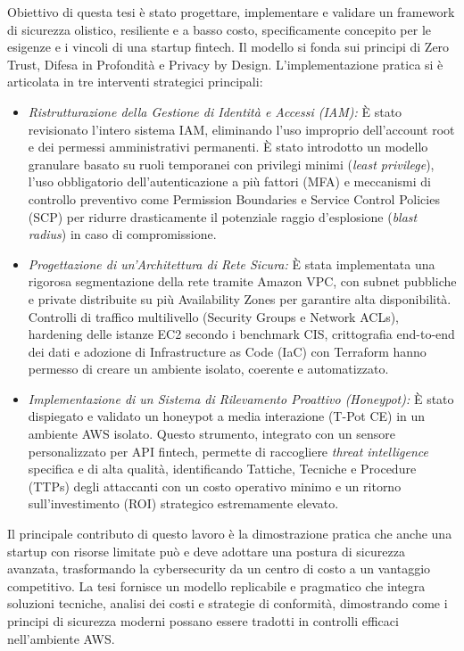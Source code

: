\documentclass[a4paper,12pt]{article}
\begin{document}
\noindent
Obiettivo di questa tesi è stato progettare, implementare e validare un framework di sicurezza olistico, resiliente e a basso costo, specificamente concepito per le esigenze e i vincoli di una startup fintech. Il modello si fonda sui principi di Zero Trust, Difesa in Profondità e Privacy by Design. L'implementazione pratica si è articolata in tre interventi strategici principali:
\begin{itemize}
    \item \textit{Ristrutturazione della Gestione di Identità e Accessi (IAM):} È stato revisionato l'intero sistema IAM, eliminando l'uso improprio dell'account root e dei permessi amministrativi permanenti. È stato introdotto un modello granulare basato su ruoli temporanei con privilegi minimi (\textit{least privilege}), l'uso obbligatorio dell'autenticazione a più fattori (MFA) e meccanismi di controllo preventivo come Permission Boundaries e Service Control Policies (SCP) per ridurre drasticamente il potenziale raggio d'esplosione (\textit{blast radius}) in caso di compromissione.
    \item \textit{Progettazione di un'Architettura di Rete Sicura:} È stata implementata una rigorosa segmentazione della rete tramite Amazon VPC, con subnet pubbliche e private distribuite su più Availability Zones per garantire alta disponibilità. Controlli di traffico multilivello (Security Groups e Network ACLs), hardening delle istanze EC2 secondo i benchmark CIS, crittografia end-to-end dei dati e adozione di Infrastructure as Code (IaC) con Terraform hanno permesso di creare un ambiente isolato, coerente e automatizzato.
    \item \textit{Implementazione di un Sistema di Rilevamento Proattivo (Honeypot):} È stato dispiegato e validato un honeypot a media interazione (T-Pot CE) in un ambiente AWS isolato. Questo strumento, integrato con un sensore personalizzato per API fintech, permette di raccogliere \textit{threat intelligence} specifica e di alta qualità, identificando Tattiche, Tecniche e Procedure (TTPs) degli attaccanti con un costo operativo minimo e un ritorno sull'investimento (ROI) strategico estremamente elevato.
\end{itemize}

\noindent
Il principale contributo di questo lavoro è la dimostrazione pratica che anche una startup con risorse limitate può e deve adottare una postura di sicurezza avanzata, trasformando la cybersecurity da un centro di costo a un vantaggio competitivo. La tesi fornisce un modello replicabile e pragmatico che integra soluzioni tecniche, analisi dei costi e strategie di conformità, dimostrando come i principi di sicurezza moderni possano essere tradotti in controlli efficaci nell'ambiente AWS.
\end{document}
